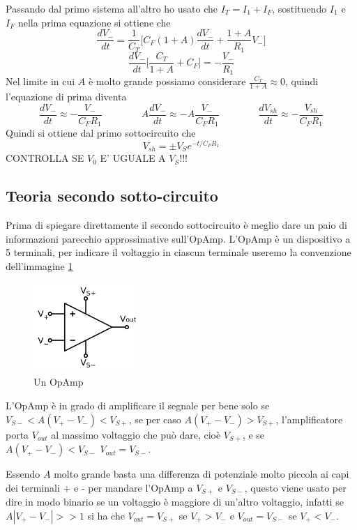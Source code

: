 \documentclass{article}
\newcommand{\vz}{V_S}
\begin{document}
			Passando dal primo sistema all'altro ho usato che $I_T=I_1+I_F$, sostituendo $I_1$ e $I_F$ nella prima equazione si ottiene che
			\[
				\frac{dV_-}{dt}=\frac{1}{C_T}\bigg[C_F(1+A)\frac{dV_-}{dt}+\frac{1+A}{R_1}V_-\bigg]
			\]
			\[
				\frac{dV_-}{dt}\bigg[\frac{C_T}{1+A}+C_F\bigg]=-\frac{V_-}{R_1}
			\]
			Nel limite in cui $A$ è molto grande possiamo considerare $\frac{C_T}{1+A}\approx0$, quindi l'equazione di prima diventa
			\[
				\frac{dV_-}{dt}\approx-\frac{V_-}{C_FR_1}\qquad\qquad
				A\frac{dV_-}{dt}\approx-A\frac{V_-}{C_FR_1}\qquad\qquad
				\frac{dV_{sh}}{dt}\approx-\frac{V_{sh}}{C_FR_1}
			\]
			Quindi si ottiene dal primo sottocircuito che\newline
			\begin{equation}
				V_{sh}=\pm \vz e^{-t/C_FR_1}
			\end{equation}
			CONTROLLA SE $V_0$ E' UGUALE A $V_S$!!!
		\subsection{Teoria secondo sotto-circuito}
			Prima di spiegare direttamente il secondo sottocircuito è meglio dare un paio di informazioni parecchio approssimative sull'OpAmp.\newline
			L'OpAmp è un dispositivo a 5 terminali, per indicare il voltaggio in ciascun terminale useremo la convenzione dell'immagine \ref{fig:OpAmp1}\newline
			\begin{figure}
				\label{fig:OpAmp1}
				\centering
				\includegraphics[width=40mm]{immagini/OpAmp1.png}
				\caption{Un OpAmp}
			\end{figure}
			L'OpAmp è in grado di amplificare il segnale per bene solo se $V_{S-}<A(V_+-V_-)<V_{S+}$, se per caso $A(V_+-V_-)>V_{S+}$, l'amplificatore porta $V_{out}$ al massimo voltaggio che può dare, cioè $V_{S+}$, e se $A(V_+-V_-)<V_{S-}$ $V_{out}=V_{S-}$.\newline

			Essendo $A$ molto grande basta una differenza di potenziale molto piccola ai capi dei terminali + e - per mandare l'OpAmp a $V_{S+}$ e $V_{S-}$, questo viene usato per dire in modo binario se un voltaggio è maggiore di un'altro voltaggio, infatti se $A|V_+-V_-|>>1$ si ha che $V_{out}=V_{S+}$ se $V_+>V_-$ e $V_{out}=V_{S-}$ se $V_+<V_-$.\newline
\end{document}

